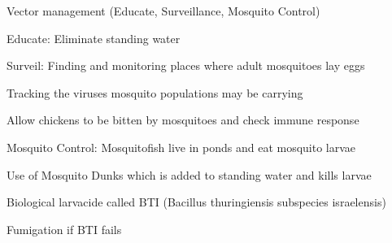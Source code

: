 \documentclass{notes}
\begin{document}
Vector management (Educate, Surveillance, Mosquito Control)

Educate: Eliminate standing water

Surveil: Finding and monitoring places where adult mosquitoes lay eggs

\tab Tracking the viruses mosquito populations may be carrying

\tab Allow chickens to be bitten by mosquitoes and check immune response

Mosquito Control: Mosquitofish live in ponds and eat mosquito larvae

\tab Use of Mosquito Dunks which is added to standing water and kills larvae

\tab \indicates Biological larvacide called BTI (Bacillus thuringiensis subspecies israelensis)

\tab Fumigation if BTI fails
\end{document}
